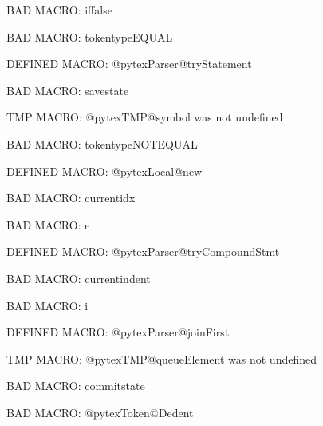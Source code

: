 BAD MACRO: iffalse

BAD MACRO: tokentypeEQUAL

\ifx\@pytexParser@tryStatement\undefined\else DEFINED MACRO: @pytexParser@tryStatement
\fi

BAD MACRO: savestate

\ifx\@pytexTMP@symbol\undefined\else TMP MACRO: @pytexTMP@symbol was not undefined
\fi

BAD MACRO: tokentypeNOTEQUAL

\ifx\@pytexLocal@new\undefined\else DEFINED MACRO: @pytexLocal@new
\fi

BAD MACRO: currentidx

BAD MACRO: e

\ifx\@pytexParser@tryCompoundStmt\undefined\else DEFINED MACRO: @pytexParser@tryCompoundStmt
\fi

BAD MACRO: currentindent

BAD MACRO: i

\ifx\@pytexParser@joinFirst\undefined\else DEFINED MACRO: @pytexParser@joinFirst
\fi

\ifx\@pytexTMP@queueElement\undefined\else TMP MACRO: @pytexTMP@queueElement was not undefined
\fi

BAD MACRO: commitstate

BAD MACRO: @pytexToken@Dedent

